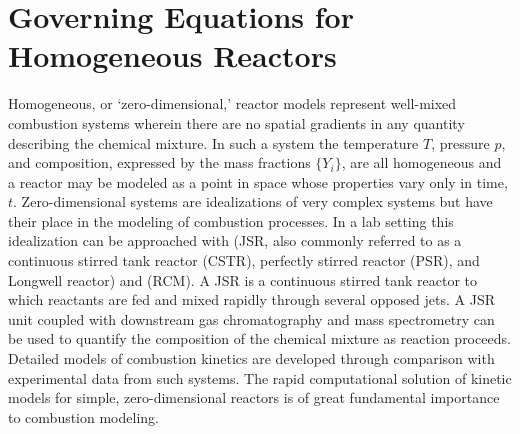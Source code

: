 \documentclass[letterpaper,10pt,english]{sphinxmanual}
\begin{document}
\section{Governing Equations for Homogeneous Reactors}
\label{\detokenize{combustion:governing-equations-for-homogeneous-reactors}}
Homogeneous, or ‘zero-dimensional,’ reactor models represent well-mixed combustion systems wherein there are no spatial gradients in any quantity describing the chemical mixture.
In such a system the temperature \(T\), pressure \(p\), and composition, expressed by the mass fractions \(\{Y_i\}\), are all homogeneous and a reactor may be modeled as a point in space whose properties vary only in time, \(t\).
Zero-dimensional systems are idealizations of very complex systems but have their place in the modeling of combustion processes.
In a lab setting this idealization can be approached with  (JSR, also commonly referred to as a continuous stirred tank reactor (CSTR), perfectly stirred reactor (PSR), and Longwell reactor) and  (RCM).
A JSR is a continuous stirred tank reactor to which reactants are fed and mixed rapidly through several opposed jets.
A JSR unit coupled with downstream gas chromatography and mass spectrometry can be used to quantify the composition of the chemical mixture as reaction proceeds.
Detailed models of combustion kinetics are developed through comparison with experimental data from such systems.
The rapid computational solution of kinetic models for simple, zero-dimensional reactors is of great fundamental importance to combustion modeling.
\end{document}
